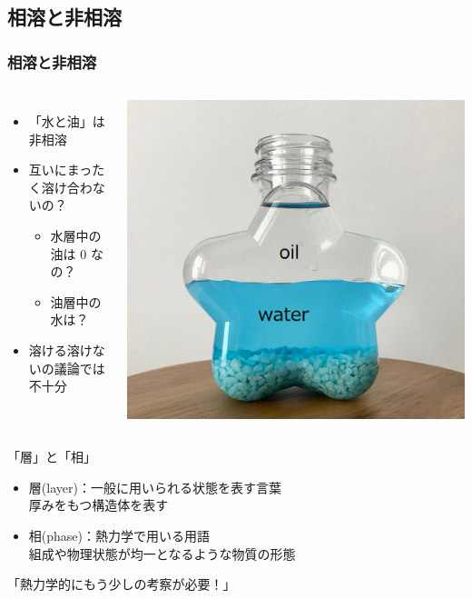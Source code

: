\documentclass[unicode,12pt]{beamer}%
\begin{document}
\subsection{相溶と非相溶}
\begin{frame}
	\frametitle{相溶と非相溶}
	\begin{columns}[c, onlytextwidth]
			\begin{itemize}
				\item 「水と油」は非相溶
				\item 互いにまったく溶け合わないの？
				\begin{itemize}
					\item 水層中の油は 0 なの？
					\item 油層中の水は？
				\end{itemize}
				\item 溶ける溶けないの議論では不十分
			\end{itemize}
				\centering
					\includegraphics[width=\textwidth]{oil_water.png}
	\end{columns}

	\pause
	\begin{exampleblock}{「層」と「相」}
		\begin{itemize}
			\item 層(layer)：一般に用いられる状態を表す言葉\\
			厚みをもつ構造体を表す
			\item 相(phase)：\alert{熱力学で用いる用語}\\
			\alert{組成や物理状態が均一}となるような物質の形態
		\end{itemize}
	\end{exampleblock}

	\pause
	\Large
	\centering
	\alert{「熱力学的にもう少しの考察が必要！」}
\end{frame}
\end{document}
